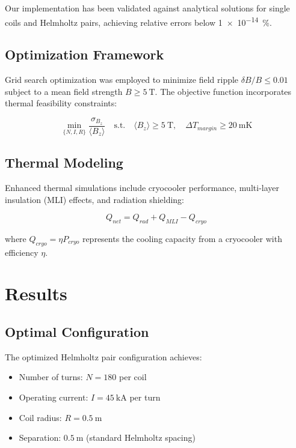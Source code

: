 \documentclass[12pt,a4paper]{article}
\begin{document}
Our implementation has been validated against analytical solutions for single coils and Helmholtz pairs, achieving relative errors below \SI{1e-14}{\percent}.

\subsection{Optimization Framework}

Grid search optimization was employed to minimize field ripple $\delta B / B \leq 0.01$ subject to a mean field strength $B \geq \SI{5}{\tesla}$. The objective function incorporates thermal feasibility constraints:

\begin{equation}
\min_{\{N,I,R\}} \frac{\sigma_{B_z}}{\langle B_z \rangle} \quad \text{s.t.} \quad \langle B_z \rangle \geq \SI{5}{\tesla}, \quad \Delta T_{margin} \geq \SI{20}{\milli\kelvin}
\end{equation}

\subsection{Thermal Modeling}

Enhanced thermal simulations include cryocooler performance, multi-layer insulation (MLI) effects, and radiation shielding:

\begin{equation}
Q_{net} = Q_{rad} + Q_{MLI} - Q_{cryo}
\end{equation}

where $Q_{cryo} = \eta P_{cryo}$ represents the cooling capacity from a cryocooler with efficiency $\eta$.

\section{Results}

\subsection{Optimal Configuration}

The optimized Helmholtz pair configuration achieves:
\begin{itemize}
\item Number of turns: $N = 180$ per coil
\item Operating current: $I = \SI{45}{\kilo\ampere}$ per turn
\item Coil radius: $R = \SI{0.5}{\meter}$
\item Separation: $\SI{0.5}{\meter}$ (standard Helmholtz spacing)
\end{itemize}
\end{document}
